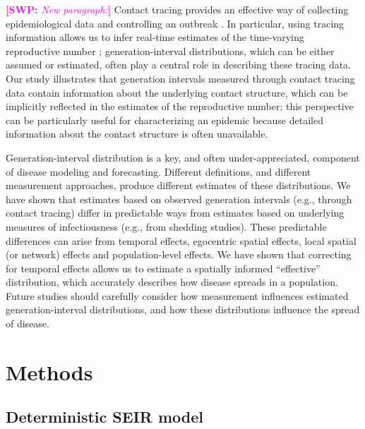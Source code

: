 \documentclass[12pt]{article}
\newcommand{\comment}[3]{\textcolor{#1}{\textbf{[#2: }\textsl{#3}\textbf{]}}}
\newcommand{\swp}[1]{\comment{magenta}{SWP}{#1}}
\begin{document}
\swp{New paragraph:}
Contact tracing provides an effective way of collecting epidemiological data and controlling an outbreak \citep{clarke1998contact, eames2003contact, donnelly2003epidemiological}.
In particular, using tracing information allows us to infer real-time estimates of the time-varying reproductive number \citep{cauchemez2006estimating, hens2012robust, jewell2012enhancing, soetens2018real};
generation-interval distributions, which can be either assumed or estimated, often play a central role in describing these tracing data.
Our study illustrates that generation intervals measured through contact tracing data contain information about the underlying contact structure, which can be implicitly reflected in the estimates of the reproductive number;
this perspective can be particularly useful for characterizing an epidemic because detailed information about the contact structure is often unavailable.

Generation-interval distribution is a key, and often under-appreciated, component of disease modeling and forecasting.
Different definitions, and different measurement approaches, produce different estimates of these distributions.
We have shown that estimates based on observed generation intervals (e.g., through contact tracing) differ in predictable ways from estimates based on underlying measures of infectiousness (e.g., from shedding studies).
These predictable differences can arise from temporal effects, egocentric spatial effects, local spatial (or network) effects and population-level effects.
We have shown that correcting for temporal effects allows us to estimate a spatially informed ``effective'' distribution, which accurately describes how disease spreads in a population. 
Future studies should carefully consider how measurement influences estimated generation-interval distributions, and how these distributions influence the spread of disease. 

\section{Methods}

\subsection{Deterministic SEIR model}
\end{document}
